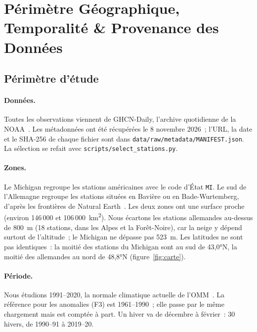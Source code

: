 \section{Périmètre Géographique, Temporalité \& Provenance des Données}
\label{sec:perimetre}

\subsection{Périmètre d'étude}

\paragraph{Données.}
Toutes les observations viennent de GHCN-Daily, l'archive quotidienne de la NOAA~\cite{menne2012}. Les métadonnées ont été récupérées le 8 novembre 2026~; l'URL, la date et le SHA-256 de chaque fichier sont dans \texttt{data/raw/metadata/MANIFEST.json}. La sélection se refait avec \texttt{scripts/select\_stations.py}.

\paragraph{Zones.}
Le Michigan regroupe les stations américaines avec le code d'État \texttt{MI}. Le sud de l'Allemagne regroupe les stations situées en Bavière ou en Bade-Wurtemberg, d'après les frontières de Natural Earth~\cite{naturalearth}. Les deux zones ont une surface proche (environ 146\,000 et 106\,000~km\textsuperscript{2}). Nous écartons les stations allemandes au-dessus de 800~m (18 stations, dans les Alpes et la Forêt-Noire), car la neige y dépend surtout de l'altitude~; le Michigan ne dépasse pas 523~m. Les latitudes ne sont pas identiques~: la moitié des stations du Michigan sont au sud de 43,0°N, la moitié des allemandes au nord de 48,8°N (figure~\ref{fig:carte}).

\paragraph{Période.}
Nous étudions 1991--2020, la normale climatique actuelle de l'OMM~\cite{wmo2017}. La référence pour les anomalies (F3) est 1961--1990~; elle passe par le même chargement mais est comptée à part. Un hiver va de décembre à février~: 30 hivers, de 1990--91 à 2019--20.

